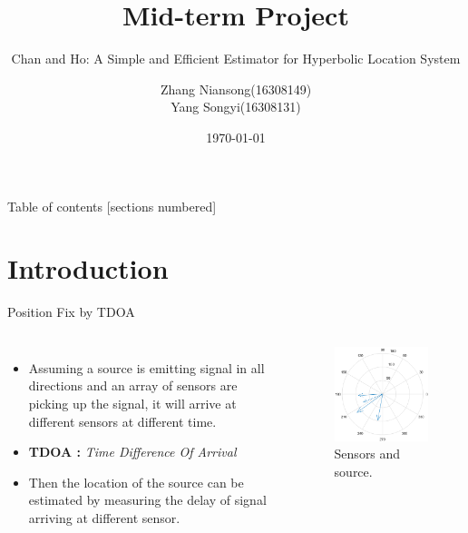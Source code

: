 \documentclass[10pt]{beamer}
\title{Mid-term Project}
\subtitle{Chan and Ho: A Simple and Efficient Estimator for Hyperbolic Location System}
\date{\today}
\author{Zhang Niansong\quad(16308149) \\ Yang Songyi\quad(16308131)}
\begin{document}
\maketitle

\begin{frame}{Table of contents}
  [sections numbered]
  \tableofcontents[hideallsubsections]
\end{frame}

\section{Introduction}

\begin{frame}{Position Fix by TDOA}
  \begin{columns}[T,onlytextwidth]
      \begin{itemize}
        \item Assuming a source is emitting signal in all directions
              and an array of sensors are picking up the signal,
              it will arrive at different sensors at different time.
        \item \textbf{TDOA :} \textit{Time Difference Of Arrival}
        \item Then the location of the source can be estimated
              by measuring the delay of signal arriving at different sensor.
      \end{itemize}
      \begin{figure}[t]
        \includegraphics[width=1\textwidth]{intro.png}
        \caption{Sensors and source.}
      \end{figure}
  \end{columns}
\end{frame}
\end{document}
